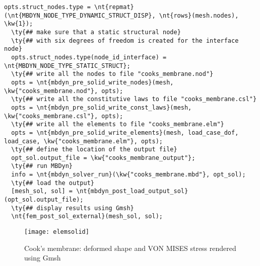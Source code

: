 \begin{Verbatim}[commandchars=\\\{\}]
  opts.struct_nodes.type = \nt{repmat}(\nt{MBDYN_NODE_TYPE_DYNAMIC_STRUCT_DISP}, \nt{rows}(mesh.nodes), \kw{1});
  \ty{## make sure that a static structural node}
  \ty{## with six degrees of freedom is created for the interface node}
  opts.struct_nodes.type(node_id_interface) = \nt{MBDYN_NODE_TYPE_STATIC_STRUCT};
  \ty{## write all the nodes to file "cooks_membrane.nod"}
  opts = \nt{mbdyn_pre_solid_write_nodes}(mesh, \kw{"cooks_membrane.nod"}, opts);
  \ty{## write all the constitutive laws to file "cooks_membrane.csl"}
  opts = \nt{mbdyn_pre_solid_write_const_laws}(mesh, \kw{"cooks_membrane.csl"}, opts);
  \ty{## write all the elements to file "cooks_membrane.elm"}
  opts = \nt{mbdyn_pre_solid_write_elements}(mesh, load_case_dof, load_case, \kw{"cooks_membrane.elm"}, opts);
  \ty{## define the location of the output file}
  opt_sol.output_file = \kw{"cooks_membrane_output"};
  \ty{## run MBDyn}
  info = \nt{mbdyn_solver_run}(\kw{"cooks_membrane.mbd"}, opt_sol);
  \ty{## load the output}
  [mesh_sol, sol] = \nt{mbdyn_post_load_output_sol}(opt_sol.output_file);
  \ty{## display results using Gmsh}
  \nt{fem_post_sol_external}(mesh_sol, sol);
\end{Verbatim}

\begin{figure}[htb]
\centering
\texttt{[image: elemsolid]}
\caption{Cook's membrane: deformed shape and VON MISES stress rendered using Gmsh}
\label{fig:EL:SOLID:COOKS-MEMBRANE}
\end{figure}
\clearpage
